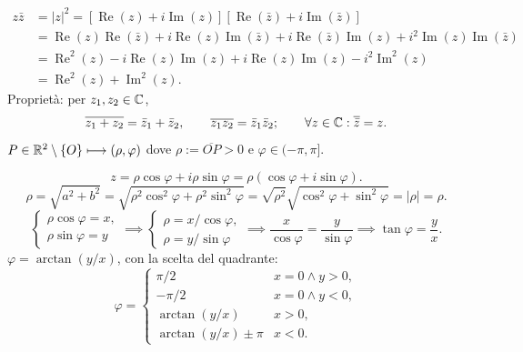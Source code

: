 \begin{align*}
z\bar z&=|z|^2=[\operatorname{Re}(z)+i\operatorname{Im}(z)][\operatorname{Re}(\bar z)+i\operatorname{Im}(\bar z)]\\
&=\operatorname{Re}(z)\operatorname{Re}(\bar z)+i\operatorname{Re}(z)\operatorname{Im}(\bar z)+i\operatorname{Re}(\bar z)\operatorname{Im}(z)+i^2\operatorname{Im}(z)\operatorname{Im}(\bar z)\\
&=\operatorname{Re}^2(z)-i\operatorname{Re}(z)\operatorname{Im}(z)+i\operatorname{Re}(z)\operatorname{Im}(z)-i^2\operatorname{Im}^2(z)\\
&=\operatorname{Re}^2(z)+\operatorname{Im}^2(z).
\end{align*}
Proprietà: per $z_1,z_2\in\mathbb C$,
\[\overline{z_1+z_2}=\bar z_1+\bar z_2,\qquad\overline{z_1z_2}=\bar z_1\bar z_2;\qquad\forall z\in\mathbb C:\overline{\bar z}=z.\]
$P\in\mathbb R^2\setminus\{O\}\longmapsto(\rho,\varphi)$ dove $\rho:=\overline{OP}>0$ e $\varphi\in(-\pi,\pi]$.
\begin{center}\end{center}
\[z=\rho\cos\varphi+i\rho\sin\varphi=\rho(\cos\varphi+i\sin\varphi).\]
\[\rho=\sqrt{a^2+b^2}=\sqrt{\rho^2\cos^2\varphi+\rho^2\sin^2\varphi}=\sqrt{\rho^2}\sqrt{\cos^2\varphi+\sin^2\varphi}=|\rho|=\rho.\]
\[\begin{cases}\rho\cos\varphi=x,\\\rho\sin\varphi=y\end{cases}\implies
\begin{cases}\rho=x/\cos\varphi,\\\rho=y/\sin\varphi\end{cases}\implies\frac{x}{\cos\varphi}=\frac y{\sin\varphi}\implies\tan\varphi=\frac yx.\]
$\varphi=\arctan(y/x)$, con la scelta del quadrante:
\[\varphi=\begin{cases}\pi/2&x=0\land y>0,\\-\pi/2&x=0\land y<0,\\\arctan(y/x)&x>0,\\\arctan(y/x)\pm\pi&x<0.\end{cases}\]
